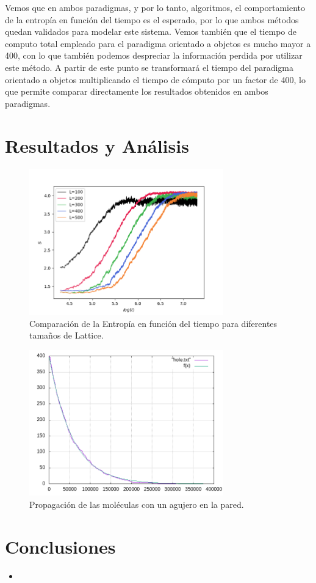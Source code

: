 \documentclass[12pt,twocolumn]{article}
\begin{document}
Vemos que en ambos paradigmas, y por lo tanto, algoritmos, el comportamiento de la entropía 
en función del tiempo es el esperado, por lo que ambos métodos quedan validados para modelar 
este sistema. Vemos también que el tiempo de computo total empleado para el paradigma orientado 
a objetos es mucho mayor a 400, con lo que también podemos despreciar la información perdida 
por utilizar este método. A partir de este punto se transformará el tiempo del paradigma 
orientado a objetos multiplicando el tiempo de cómputo por un factor de 400, lo que permite 
comparar directamente los resultados obtenidos en ambos paradigmas.

\section{Resultados y Análisis}

\begin{figure}
    \centering
    \includegraphics[width=0.75\textwidth]{figs/S_vs_t_sizes.png}
    \caption{Comparación de la Entropía en función del tiempo para diferentes tamaños de Lattice.}
    \label{fig:hole}
\end{figure}

\begin{figure}
    \centering
    \includegraphics[width=0.75\textwidth]{figs/hole.png}
    \caption{Propagación de las moléculas con un agujero en la pared.}
    \label{fig:hole}
\end{figure}

\section{Conclusiones}
\begin{itemize}
    \item 
\end{itemize}
\end{document}
